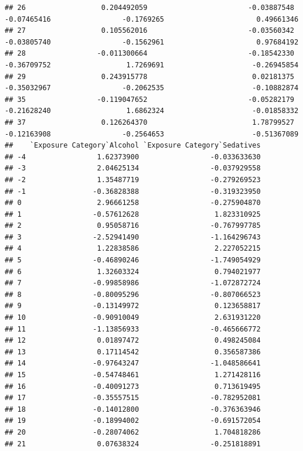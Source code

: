 \documentclass[
]{article}
\begin{document}
\begin{verbatim}
## 26                  0.204492059                        -0.03887548                   -0.07465416                 -0.1769265                      0.49661346
## 27                  0.105562016                        -0.03560342                   -0.03805740                 -0.1562961                      0.97684192
## 28                 -0.011300664                        -0.18542330                   -0.36709752                  1.7269691                     -0.26945854
## 29                  0.243915778                         0.02181375                   -0.35032967                 -0.2062535                     -0.10882874
## 35                 -0.119047652                        -0.05282179                   -0.21628240                  1.6862324                     -0.01858332
## 37                  0.126264370                         1.78799527                   -0.12163908                 -0.2564653                     -0.51367089
##    `Exposure Category`Alcohol `Exposure Category`Sedatives
## -4                 1.62373900                 -0.033633630
## -3                 2.04625134                 -0.037929558
## -2                 1.35487719                 -0.279269523
## -1                -0.36828388                 -0.319323950
## 0                  2.96661258                 -0.275904870
## 1                 -0.57612628                  1.823310925
## 2                  0.95058716                 -0.767997785
## 3                 -2.52941490                 -1.164296743
## 4                  1.22838586                  2.227052215
## 5                 -0.46890246                 -1.749054929
## 6                  1.32603324                  0.794021977
## 7                 -0.99858986                 -1.072872724
## 8                 -0.80095296                 -0.807066523
## 9                 -0.13149972                  0.123658817
## 10                -0.90910049                  2.631931220
## 11                -1.13856933                 -0.465666772
## 12                 0.01897472                  0.498245084
## 13                 0.17114542                  0.356587386
## 14                -0.97643247                 -1.048586641
## 15                -0.54748461                  1.271428116
## 16                -0.40091273                  0.713619495
## 17                -0.35557515                 -0.782952081
## 18                -0.14012800                 -0.376363946
## 19                -0.18994002                 -0.691572054
## 20                -0.28074062                  1.704818286
## 21                 0.07638324                 -0.251818891

\end{verbatim}
\end{document}
